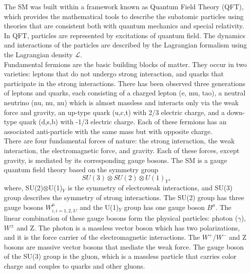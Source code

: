 \documentclass[thesis.tex]{subfiles}
\begin{document}
The SM was built within a framework known as Quantum Field Theory (QFT), which provides the mathematical tools to describe the subatomic particles using theories that are consistent both with quantum mechanics and special relativity. 
In QFT, particles are represented by excitations of quantum field. 
The dynamics and interactions of the particles are described by the Lagrangian formalism using the Lagrangian density $\mathcal{L}$. \\

Fundamental fermions are the basic building blocks of matter. 
They occur in two varieties: leptons that do not undergo strong interaction, and quarks that participate in the strong interactions. 
There has been observed three generations of leptons and quarks, each consisting of a charged lepton (e, mu, tao), a neutral neutrino (nu, nu, nu) which is almost massless and interacts only via the weak force and gravity, an up-type quark (u,c,t) with 2/3 electric charge, and a down-type quark (d,s,b) with -1/3 electric charge. 
Each of these fermions has an associated anti-particle with the same mass but with opposite charge. \\

There are four fundamental forces of nature: the strong interaction, the weak interaction, the electromagnetic force, and gravity. 
Each of these forces, except gravity, is mediated by its corresponding gauge bosons. 
The SM is a gauge quantum field theory based on the symmetry group 
	\begin{equation}
		SU(3) \otimes SU(2) \otimes U(1)_Y,
	\end{equation}
 where, SU(2)$\otimes$U(1)$_Y$ is the symmetry of electroweak interactions, and SU(3) group describes the symmetry of strong interactions. 
The SU(2) group has three gauge bosons $W_{i, i = 1,2,3}^{\mu}$, and the U(1)$_Y$ group has one gauge boson $B^{\mu}$. 
The linear combination of these gauge bosons form the physical particles: photon ($\gamma$), $W^{\pm}$ and Z. 
The photon is a massless vector boson which has two polarizations, and it is the force carrier of the electromagnetic interactions. 
The $W^+$/$W^{-}$ and Z bosons are massive vector bosons that mediate the weak force. 
The gauge boson of the SU(3) group is the gluon, which is a massless particle that carries color charge and couples to quarks and other gluons. \\
 
\end{document}
